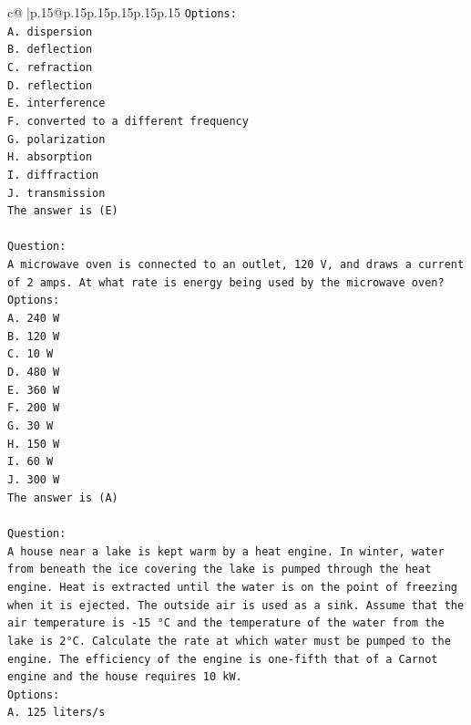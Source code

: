 \documentclass{article}
\begin{document}
{\begin{supertabular}{c@{$\;$}|p{.15\linewidth}@{}p{.15\linewidth}p{.15\linewidth}p{.15\linewidth}p{.15\linewidth}p{.15\linewidth}}
{{{\texttt{Options:} \\
\texttt{A. dispersion} \\
\texttt{B. deflection} \\
\texttt{C. refraction} \\
\texttt{D. reflection} \\
\texttt{E. interference} \\
\texttt{F. converted to a different frequency} \\
\texttt{G. polarization} \\
\texttt{H. absorption} \\
\texttt{I. diffraction} \\
\texttt{J. transmission} \\
\texttt{The answer is (E)} \\
\\ 
\texttt{Question:} \\
\texttt{A microwave oven is connected to an outlet, 120 V, and draws a current of 2 amps. At what rate is energy being used by the microwave oven?} \\
\texttt{Options:} \\
\texttt{A. 240 W} \\
\texttt{B. 120 W} \\
\texttt{C. 10 W} \\
\texttt{D. 480 W} \\
\texttt{E. 360 W} \\
\texttt{F. 200 W} \\
\texttt{G. 30 W} \\
\texttt{H. 150 W} \\
\texttt{I. 60 W} \\
\texttt{J. 300 W} \\
\texttt{The answer is (A)} \\
\\ 
\texttt{Question:} \\
\texttt{A house near a lake is kept warm by a heat engine. In winter, water from beneath the ice covering the lake is pumped through the heat engine. Heat is extracted until the water is on the point of freezing when it is ejected. The outside air is used as a sink. Assume that the air temperature is {-}15 °C and the temperature of the water from the lake is 2°C. Calculate the rate at which water must be pumped to the engine. The efficiency of the engine is one{-}fifth that of a Carnot engine and the house requires 10 kW.} \\
\texttt{Options:} \\
\texttt{A. 125 liters/s} \\
}}}
\end{supertabular}}
\end{document}
